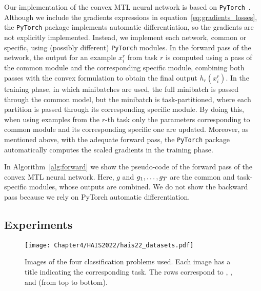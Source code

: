 Our implementation of the convex MTL neural network is based on \texttt{PyTorch}~\citep{PyTorch}.
Although we include the gradients expressions in equation~\eqref{eq:gradients_losses}, the \texttt{PyTorch} package implements automatic differentiation, so the gradients are not explicitly implemented.
Instead, we implement each network, common or specific, using (possibly different) \texttt{PyTorch} modules.
In the forward pass of the network, the output for an example $x_i^r$ from task $r$ is computed using a pass of the common module and the corresponding specific module, combining both passes with the convex formulation to obtain the final output $h_r(x_i^r)$.
In the training phase, in which minibatches are used, the full minibatch is passed through the common model, but the minibatch is task-partitioned, where each partition is passed through its corresponding specific module.
By doing this, when using examples from the $r$-th task only the parameters corresponding to common module and its corresponding specific one are updated.
Moreover, as mentioned above, with the adequate forward pass, the \texttt{PyTorch} package automatically computes the scaled gradients in the training phase.

{In Algorithm~\ref{alg:forward} we show the pseudo-code of the forward pass of the convex MTL neural network. Here, $g$ and $g_1, \ldots, g_T$ are the common and task-specific modules, whose outputs are combined. We do not show the backward pass because we rely on PyTorch automatic differentiation.}




\subsection{Experiments}

\begin{figure}[t!]
    \texttt{[image: Chapter4/HAIS2022/hais22\_datasets.pdf]}
    \caption{Images of the four classification problems used. Each image has a title indicating the corresponding task. The rows correspond to , ,  and  (from top to bottom).}
    \label{fig:problems_hais2022}
\end{figure}

